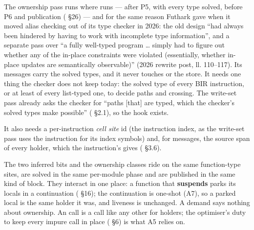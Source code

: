 

The ownership pass runs where  runs — after P5, with every type solved, before P6 and publication ( §26) — and for the same reason Futhark gave when it moved alias checking out of its type checker in 2026: the old design “had always been hindered by having to work with incomplete type information”, and a separate pass over “a fully well-typed program … simply had to figure out whether any of the in-place constraints were violated (essentially, whether in-place updates are semantically observable)” (2026 rewrite post, ll. 110–117). Its messages carry the solved types, and it never touches  or the store. It needs one thing the checker does not keep today: the solved type of every BIR instruction, or at least of every list-typed one, to decide paths and crossing. The write-set pass already asks the checker for “paths [that] are typed, which the checker's solved types make possible” ( §2.1), so the hook exists.

It also needs a per-instruction \emph{cell site} id (the instruction index, as the write-set pass uses the instruction for its index symbols) and, for messages, the source span of every holder, which the instruction's  gives ( §3.6).


The two inferred bits and the ownership classes ride on the same function-type sites, are solved in the same per-module phase and are published in the same kind of block. They interact in one place: a function that \textbf{suspends} parks its locals in a continuation ( §16); the continuation is one-shot (A7), so a parked local is the same holder it was, and liveness is unchanged. A  demand says nothing about ownership. An  call is a call like any other for holders; the optimiser's duty to keep every impure call in place ( §6) is what A5 relies on.


